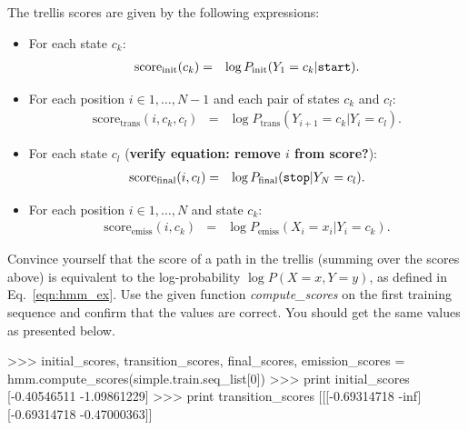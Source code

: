 \begin{exercise}
The trellis scores are given by the following expressions:
\begin{itemize}
\item For each state $c_k$:
\begin{eqnarray}
\mathrm{score}_{\mathrm{init}}(c_k) &=&
\log P_{\mathrm{init}}(Y_{1} = c_k | \text{\tt start}).
\end{eqnarray}
\item For each position $i \in {1,\ldots,N-1}$ and each pair of states $c_k$ and $c_l$:
\begin{eqnarray}
\mathrm{score}_{\mathrm{trans}}(i, c_k, c_l) &=&
\log P_{\mathrm{trans}}(Y_{i+1} = c_k | Y_i = c_l).
\end{eqnarray}
\item For each state $c_l$ (\textbf{verify equation: remove $i$ from score?}):
\begin{eqnarray}
\mathrm{score}_{\mathrm{final}}(i, c_l) &=&
\log P_{\mathrm{final}}(\text{\tt stop} | Y_N = c_l).
\end{eqnarray}
\item For each position $i \in {1,\ldots,N}$ and state $c_k$:
\begin{eqnarray}
\mathrm{score}_{\mathrm{emiss}}(i, c_k) &=&
\log P_{\mathrm{emiss}}(X_i = x_i | Y_i = c_k).
\end{eqnarray}
\end{itemize}

Convince yourself that the score of a path in the trellis 
(summing over the scores above) is equivalent 
to the log-probability $\log P(X=x,Y=y)$, 
as defined in 
Eq.~\ref{eqn:hmm_ex}. 
Use the given function \emph{compute\_scores} on the first training sequence and confirm that the values are correct. You should get the same values as presented below.


%

\begin{python}
>>> initial_scores, transition_scores, final_scores, emission_scores = hmm.compute_scores(simple.train.seq_list[0])
>>> print initial_scores
[-0.40546511 -1.09861229]
>>> print transition_scores
[[[-0.69314718        -inf]
  [-0.69314718 -0.47000363]]


\end{python}
\end{exercise}
